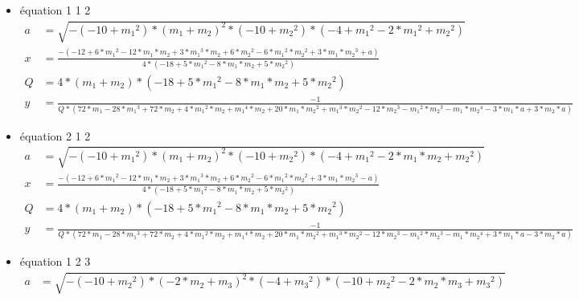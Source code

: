 \documentclass[a4paper, 8pt]{article}
\begin{document}
\begin{itemize}[label=$\bullet$]
		
\item équation 1 1 2
{\tiny
\begin{equation} \label{3}
	\begin{split}
	a & = \sqrt{-(-10+{{m}_{1}}^{2})*{({m}_{1}+{m}_{2})}^{2}*(-10+{{m}_{2}}^{2})*(-4+{{m}_{1}}^{2}-2*{{m}_{1}}^{2}+{{m}_{2}}^{2})}\\
	x & = \frac{-(-12+6*{{m}_{1}}^{2}-12*{m}_{1}*{m}_{2}+3*{{m}_{1}}^{3}*{m}_{2}+6*{{m}_{2}}^{2}-6*{{m}_{1}}^{2}*{{m}_{2}}^{2}+3*{m}_{1}*{{m}_{2}}^{3}+a)}{4*(-18+5*{{m}_{1}}^{2}-8*{m}_{1}*{m}_{2}+5*{{m}_{2}}^{2})} \\
	Q & = 4*({m}_{1}+{m}_{2})*(-18+5*{{m}_{1}}^{2}-8*{m}_{1}*{m}_{2}+5*{{m}_{2}}^{2})\\
	y & =  \frac{-1}{Q*(72*{m}_{1}-28*{{m}_{1}}^{3}+72*{m}_{2}+4*{{m}_{1}}^{2}*{m}_{2}+{{m}_{1}}^{4}*{m}_{2}+20*{m}_{1}*{{m}_{2}}^{2}+{{m}_{1}}^{3}*{{m}_{2}}^{2}-12*{{m}_{2}}^{3}-{{m}_{1}}^{2}*{{m}_{2}}^{3}-{m}_{1}*{{m}_{2}}^{4}-3*{m}_{1}*a+3*{m}_{2}*a)} 
	\end{split}
	\end{equation}
}
\item équation 2 1 2
{\tiny
   \begin{equation} \label{4}
   	\begin{split}
    a & = \sqrt{-(-10+{{m}_{1}}^{2})*{({m}_{1}+{m}_{2})}^{2}*(-10+{{m}_{2}}^{2})*(-4+{{m}_{1}}^{2}-2*{m}_{1}*{m}_{2}+{{m}_{2}}^{2})}\\
   	x & = \frac{-(-12+6*{{m}_{1}}^{2}-12*{m}_{1}*{m}_{2}+3*{{m}_{1}}^{3}*{m}_{2}+6*{{m}_{2}}^{2}-6*{{m}_{1}}^{2}*{{m}_{2}}^{2}+3*{m}_{1}*{{m}_{2}}^{3}-a)}{4*(-18+5*{{m}_{1}}^{2}-8*{m}_{1}*{m}_{2}+5*{{m}_{2}}^{2})} \\
   	Q & = 4*({m}_{1}+{m}_{2})*(-18+5* {{m}_{1}}^{2}-8*{m}_{1}*{m}_{2}+5*{{m}_{2}}^{2})\\
   	 y &  = \frac{-1}{Q*(72*{m}_{1}-28*{{m}_{1}}^{3}+72*{m}_{2}+4*{{m}_{1}}^{2}*{m}_{2}+{{m}_{1}}^{4}*{m}_{2}+20*{m}_{1}*{{m}_{2}}^{2}+{{m}_{1}}^{3}*{{m}_{2}}^{2}-12*{{m}_{2}}^{3}-{{m}_{1}}^{2}* {{m}_{2}}^{3}-{m}_{1}*{{m}_{2}}^{4}+3*{m}_{1}*a-3*{m}_{2}*a)} 
   	\end{split}
   	\end{equation}
}
\item équation 1 2 3
{\tiny
 \begin{equation} \label{5}
   	\begin{split}
   a & = \sqrt{-(-10+{{m}_{2}}^{2})*{(-2*{m}_{2}+{m}_{3})}^{2}*(-4+{{m}_{3}}^{2})*(-10+{{m}_{2}}^{2}-2*{m}_{2}*{m}_{3}+{{m}_{3}}^{2})}\\

\end{split}
\end{equation}}
\end{itemize}
\end{document}
